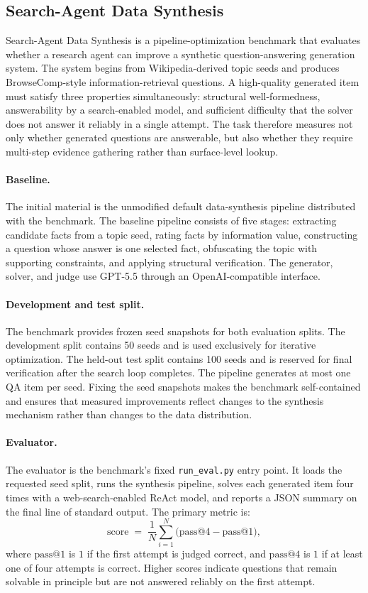 \subsection{Search-Agent Data Synthesis}
\label{app:benchmark-search-agent-data}

Search-Agent Data Synthesis is a pipeline-optimization benchmark that
evaluates whether a research agent can improve a synthetic question-answering
generation system.
The system begins from Wikipedia-derived topic seeds and produces
BrowseComp-style information-retrieval questions.
A high-quality generated item must satisfy three properties simultaneously:
structural well-formedness, answerability by a search-enabled model, and
sufficient difficulty that the solver does not answer it reliably in a single
attempt.
The task therefore measures not only whether generated questions are
answerable, but also whether they require multi-step evidence gathering rather
than surface-level lookup.

\paragraph{Baseline.}
The initial material is the unmodified default data-synthesis pipeline
distributed with the benchmark.
The baseline pipeline consists of five stages: extracting candidate facts from
a topic seed, rating facts by information value, constructing a question whose
answer is one selected fact, obfuscating the topic with supporting constraints,
and applying structural verification.
The generator, solver, and judge use GPT-5.5 through an OpenAI-compatible
interface.

\paragraph{Development and test split.}
The benchmark provides frozen seed snapshots for both evaluation splits.
The development split contains 50 seeds and is used exclusively for iterative
optimization.
The held-out test split contains 100 seeds and is reserved for final
verification after the search loop completes.
The pipeline generates at most one QA item per seed.
Fixing the seed snapshots makes the benchmark self-contained and ensures that
measured improvements reflect changes to the synthesis mechanism rather than
changes to the data distribution.

\paragraph{Evaluator.}
The evaluator is the benchmark's fixed \texttt{run\_eval.py} entry point.
It loads the requested seed split, runs the synthesis pipeline, solves each
generated item four times with a web-search-enabled ReAct model, and reports
a JSON summary on the final line of standard output.
The primary metric is:
\[
\mathrm{score}
\;=\;
\frac{1}{N}\sum_{i=1}^{N}
\bigl(\mathrm{pass@4} - \mathrm{pass@1}\bigr),
\]
where $\mathrm{pass@1}$ is $1$ if the first attempt is judged correct, and
$\mathrm{pass@4}$ is $1$ if at least one of four attempts is correct.
Higher scores indicate questions that remain solvable in principle but are
not answered reliably on the first attempt.


